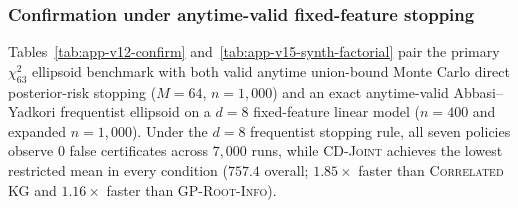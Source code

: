\documentclass{article}
\theoremstyle{plain}
\theoremstyle{definition}
\begin{document}
\subsubsection{Confirmation under anytime-valid fixed-feature stopping}

Tables~\ref{tab:app-v12-confirm} and~\ref{tab:app-v15-synth-factorial} pair the primary $\chi^2_{63}$ ellipsoid benchmark with both valid anytime union-bound Monte Carlo direct posterior-risk stopping ($M=64$, $n=1{,}000$) and an exact anytime-valid Abbasi--Yadkori frequentist ellipsoid on a $d=8$ fixed-feature linear model ($n=400$ and expanded $n=1{,}000$). Under the $d=8$ frequentist stopping rule, all seven policies observe $0$ false certificates across $7{,}000$ runs, while \textsc{CD-Joint} achieves the lowest restricted mean in every condition ($757.4$ overall; $1.85\times$ faster than \textsc{Correlated KG} and $1.16\times$ faster than \textsc{GP-Root-Info}).
\end{document}
